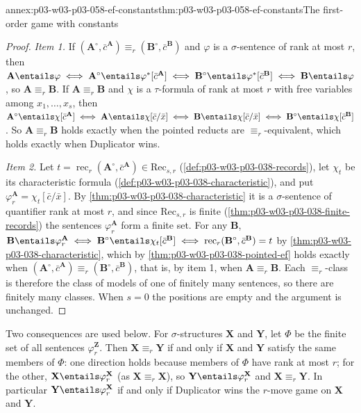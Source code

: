 \begin{annexitem}{annex:p03-w03-p03-058-ef-constants}{thm:p03-w03-p03-058-ef-constants}{The first-order game with constants}
\begin{proof}
\emph{Item 1.} If \((\mathbf A^\circ,\bar c^{\mathbf A})\equiv_r
(\mathbf B^\circ,\bar c^{\mathbf B})\) and \(\varphi\) is a
\(\sigma\)-sentence of rank at most \(r\), then
\(\mathbf A\entails\varphi\iff\mathbf A^\circ\entails\varphi^*[\bar
c^{\mathbf A}]\iff\mathbf B^\circ\entails\varphi^*[\bar c^{\mathbf B}]
\iff\mathbf B\entails\varphi\), so \(\mathbf A\equiv_r\mathbf B\). If
\(\mathbf A\equiv_r\mathbf B\) and \(\chi\) is a \(\tau\)-formula of rank at
most \(r\) with free variables among \(x_1,\ldots,x_s\), then
\(\mathbf A^\circ\entails\chi[\bar c^{\mathbf A}]\iff\mathbf A\entails
\chi[\bar c/\bar x]\iff\mathbf B\entails\chi[\bar c/\bar x]\iff
\mathbf B^\circ\entails\chi[\bar c^{\mathbf B}]\). So
\(\mathbf A\equiv_r\mathbf B\) holds exactly when the pointed reducts are
\(\equiv_r\)-equivalent, which holds exactly when Duplicator wins.

\emph{Item 2.} Let \(t=\operatorname{rec}_r(\mathbf A^\circ,\bar
c^{\mathbf A})\in\mathrm{Rec}_{s,r}\) (\cref{def:p03-w03-p03-038-records}),
let \(\chi_t\) be its characteristic formula
(\cref{def:p03-w03-p03-038-characteristic}), and put
\(\varphi^{\mathbf A}_r=\chi_t[\bar c/\bar x]\). By
\cref{thm:p03-w03-p03-038-characteristic} it is a \(\sigma\)-sentence of
quantifier rank at most \(r\), and since \(\mathrm{Rec}_{s,r}\) is finite
(\cref{thm:p03-w03-p03-038-finite-records}) the sentences
\(\varphi^{\mathbf A}_r\) form a finite set. For any \(\mathbf B\),
\(\mathbf B\entails\varphi^{\mathbf A}_r\iff\mathbf B^\circ\entails
\chi_t[\bar c^{\mathbf B}]\iff\operatorname{rec}_r(\mathbf B^\circ,\bar
c^{\mathbf B})=t\) by \cref{thm:p03-w03-p03-038-characteristic}, which by
\cref{thm:p03-w03-p03-038-pointed-ef} holds exactly when
\((\mathbf A^\circ,\bar c^{\mathbf A})\equiv_r(\mathbf B^\circ,\bar
c^{\mathbf B})\), that is, by item 1, when \(\mathbf A\equiv_r\mathbf B\).
Each \(\equiv_r\)-class is therefore the class of models of one of finitely
many sentences, so there are finitely many classes. When \(s=0\) the
positions are empty and the argument is unchanged.
\end{proof}
\end{annexitem}

Two consequences are used below. For \(\sigma\)-structures \(\mathbf X\) and
\(\mathbf Y\), let \(\Phi\) be the finite set of all sentences
\(\varphi^{\mathbf Z}_r\). Then
\(\mathbf X\equiv_r\mathbf Y\) if and only if \(\mathbf X\) and \(\mathbf Y\)
satisfy the same members of \(\Phi\): one direction holds because members of
\(\Phi\) have rank at most \(r\); for the other, \(\mathbf X\entails
\varphi^{\mathbf X}_r\) (as \(\mathbf X\equiv_r\mathbf X\)), so
\(\mathbf Y\entails\varphi^{\mathbf X}_r\) and
\(\mathbf X\equiv_r\mathbf Y\). In particular
\(\mathbf Y\entails\varphi^{\mathbf X}_r\) if and only if Duplicator wins the
\(r\)-move game on \(\mathbf X\) and \(\mathbf Y\).

